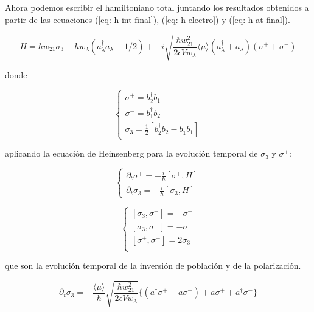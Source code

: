 Ahora podemos escribir el hamiltoniano total juntando los resultados obtenidos a partir de las ecuaciones (\ref{eq: h int final}), (\ref{eq: h electro}) y (\ref{eq: h at final}).

\begin{equation}
	H=\hbar w_{21} \sigma_3 + \hbar w_{\lambda}(a^{\dagger}_{\lambda}a_{\lambda}+1/2) + -i\sqrt{ \frac{\hbar w_{21}^2}{2\epsilon V w_{\lambda} } }   \langle \mu \rangle (a^{\dagger}_{\lambda}+a_{\lambda})(\sigma^+ + \sigma^-) 
\end{equation}

donde 

\begin{equation}
	\begin{cases}
		\sigma^+=b^{\dagger}_2b_{1}\\
		\sigma^-=b^{\dagger}_1b_{2}\\
		\sigma_3=\frac{1}{2}[b^{\dagger}_2b_2-b^{\dagger}_1b_1]	
	\end{cases}
\end{equation}

aplicando la ecuación de Heinsenberg para la evolución temporal de $\sigma_3$ y $\sigma^+$:

\begin{equation}
	\begin{cases}
		\partial_t \sigma^+=-\frac{i}{\hbar}[\sigma^+,H]\\

		\partial_t \sigma_3=-\frac{i}{\hbar}[\sigma_3,H]	
	\end{cases}
\end{equation}

\begin{equation}
\begin{cases}
[\sigma_3,\sigma^+]=-\sigma^+\\
[\sigma_3,\sigma^-]=-\sigma^-\\
[\sigma^+,\sigma^-]=2\sigma_3\\	
\end{cases}
\end{equation}

que son la evolución temporal de la inversión de población y de la polarización.

\begin{equation}
	\partial_t \sigma_3=-\frac{\langle \mu \rangle }{\hbar}	\sqrt{ \frac{\hbar w_{21}^2}{2\epsilon V w_{\lambda} } } \{ (a^{\dagger}\sigma^+ - a\sigma^- )+a\sigma^+ +a^{\dagger}\sigma^-   \}
\end{equation}


